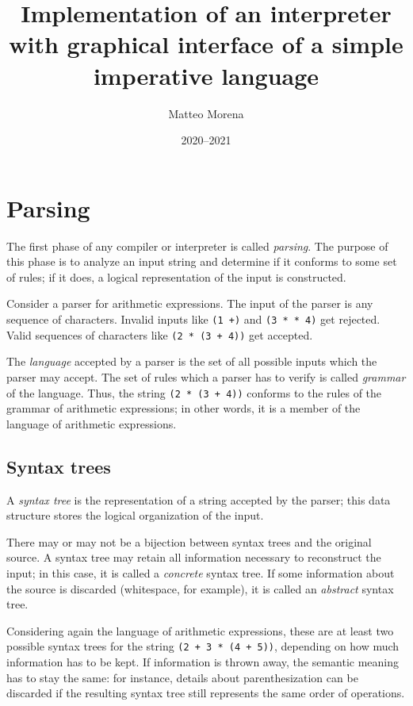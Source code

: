 \documentclass[12pt, american, draft]{PhdThesis}
\author{Matteo Morena}
\title{Implementation of an interpreter with graphical interface of a simple imperative language}
\date{2020--2021}
\begin{document}
  \pagestyle{empty}

  \maketitle

  \frontmatter

  \pagestyle{serif}

  \mainmatter

  \chapter{Parsing}

  The first phase of any compiler or interpreter is called \emph{parsing}. The purpose of this
  phase is to analyze an input string and determine if it conforms to some set of rules; if it
  does, a logical representation of the input is constructed.

  Consider a parser for arithmetic expressions. The input of the parser is any sequence of
  characters. Invalid inputs like \mbox{\texttt{(1 +)}} and \mbox{\texttt{(3 * * 4)}} get rejected.
  Valid sequences of characters like \mbox{\texttt{(2 * (3 + 4))}} get accepted.

  The \emph{language} accepted by a parser is the set of all possible inputs which the parser may
  accept. The set of rules which a parser has to verify is called \emph{grammar} of the language.
  Thus, the string \mbox{\texttt{(2 * (3 + 4))}} conforms to the rules of the grammar of arithmetic
  expressions; in other words, it is a member of the language of arithmetic expressions.

  \section{Syntax trees}

  A \emph{syntax tree} is the representation of a string accepted by the parser; this data
  structure stores the logical organization of the input.

  There may or may not be a bijection between syntax trees and the original source. A syntax tree
  may retain all information necessary to reconstruct the input; in this case, it is called a
  \emph{concrete} syntax tree. If some information about the source is discarded (whitespace, for
  example), it is called an \emph{abstract} syntax tree.

  Considering again the language of arithmetic expressions, these are at least two possible syntax
  trees for the string \mbox{\texttt{(2 + 3 * (4 + 5))}}, depending on how much information has to
  be kept. If information is thrown away, the semantic meaning has to stay the same: for instance,
  details about parenthesization can be discarded if the resulting syntax tree still represents the
  same order of operations.
\end{document}
